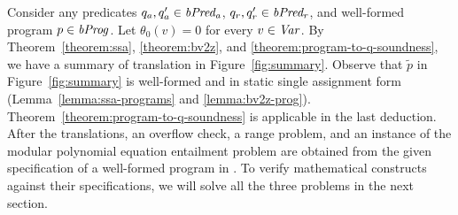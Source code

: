Consider any predicates $q_a, q_a' \in \mathit{bPred_a}$, $q_r, q_r' \in \mathit{bPred_r}$, and well-formed program $p \in
\mathit{bProg}$. Let $\theta_0 (v) = 0$ for every $v \in \mathit{Var}$. By
Theorem~\ref{theorem:ssa}, \ref{theorem:bv2z}, and \ref{theorem:program-to-q-soundness}, we have a summary of translation in Figure~\ref{fig:summary}.
Observe that $\tilde{p}$ in Figure~\ref{fig:summary} is well-formed and in static single assignment
form (Lemma~\ref{lemma:ssa-programs} and \ref{lemma:bv2z-prog}).
Theorem~\ref{theorem:program-to-q-soundness} is applicable in the last
deduction. After the translations, an overflow check, a range problem, and an instance of the modular
polynomial equation entailment problem are obtained from the given
specification of a well-formed program in \bvdsl.
To verify mathematical constructs against their specifications, we will solve all the three problems in the next section.

